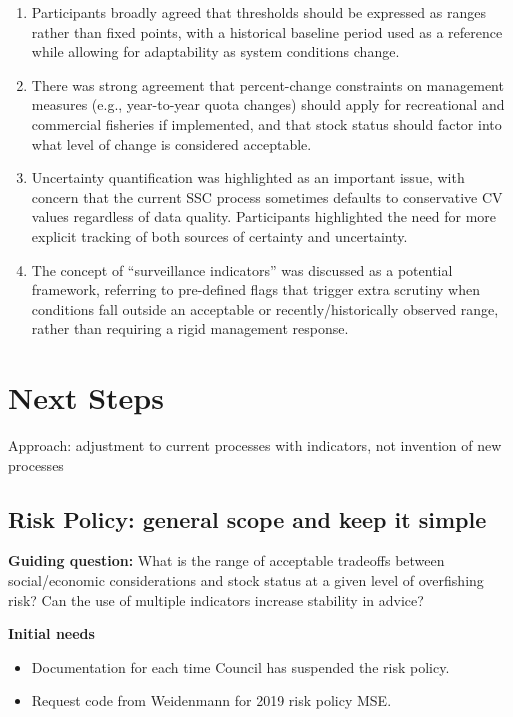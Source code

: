 \documentclass[
]{article}
\providecommand{\tightlist}{%
  \setlength{\itemsep}{0pt}\setlength{\parskip}{0pt}}
\begin{document}
\begin{enumerate}
\def\labelenumi{\arabic{enumi}.}
\tightlist
\item
  Participants broadly agreed that thresholds should be expressed as ranges rather than fixed points, with a historical baseline period used as a reference while allowing for adaptability as system conditions change.\\
\item
  There was strong agreement that percent-change constraints on management measures (e.g., year-to-year quota changes) should apply for recreational and commercial fisheries if implemented, and that stock status should factor into what level of change is considered acceptable.\\
\item
  Uncertainty quantification was highlighted as an important issue, with concern that the current SSC process sometimes defaults to conservative CV values regardless of data quality. Participants highlighted the need for more explicit tracking of both sources of certainty and uncertainty.\\
\item
  The concept of ``surveillance indicators'' was discussed as a potential framework, referring to pre-defined flags that trigger extra scrutiny when conditions fall outside an acceptable or recently/historically observed range, rather than requiring a rigid management response.
\end{enumerate}

\section{Next Steps}\label{next-steps}

Approach: adjustment to current processes with indicators, not invention of new processes

\subsection{Risk Policy: general scope and keep it simple}\label{risk-policy-general-scope-and-keep-it-simple}

\textbf{Guiding question:} What is the range of acceptable tradeoffs between social/economic considerations and stock status at a given level of overfishing risk? Can the use of multiple indicators increase stability in advice?

\textbf{Initial needs}

\begin{itemize}
\tightlist
\item
  Documentation for each time Council has suspended the risk policy.
\item
  Request code from Weidenmann for 2019 risk policy MSE.
\end{itemize}
\end{document}
